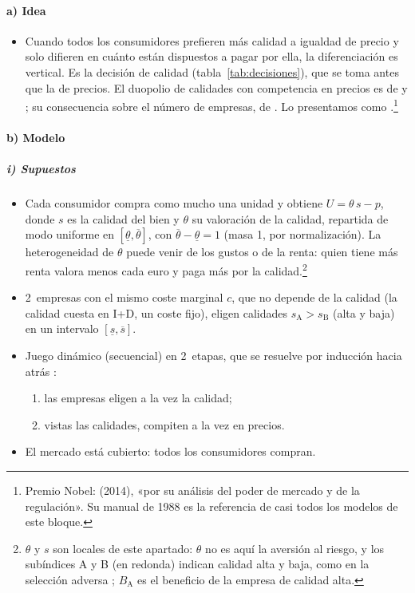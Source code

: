 \documentclass[11pt]{article}
\begin{document}
\paragraph{a) Idea}

\begin{itemize}
\item Cuando todos los consumidores prefieren más calidad a igualdad de precio y solo difieren en cuánto están dispuestos a pagar por ella, la diferenciación es vertical. Es la decisión de calidad (tabla~\ref{tab:decisiones}), que se toma antes que la de precios. El duopolio de calidades con competencia en precios es de \textcite{GabszewiczThisse1979Price} y \textcite{ShakedSutton1982Relaxing}; su consecuencia sobre el número de empresas, de \textcite{ShakedSutton1983Natural}. Lo presentamos como \textcite[cap.~7]{Tirole1988Theory}.\footnote{Premio Nobel:  (2014), «por su análisis del poder de mercado y de la regulación»\nocite{Nobel2014Tirole}. Su manual de 1988 es la referencia de casi todos los modelos de este bloque.}
\end{itemize}

\paragraph{b) Modelo}

\subparagraph{i) Supuestos}

\begin{itemize}
\item Cada consumidor compra como mucho una unidad y obtiene $U=\theta\,s-p$, donde $s$ es la calidad del bien y $\theta$ su valoración de la calidad, repartida de modo uniforme en $[\underline{\theta},\overline{\theta}]$, con $\overline{\theta}-\underline{\theta}=1$ (masa 1, por normalización). La heterogeneidad de $\theta$ puede venir de los gustos o de la renta: quien tiene más renta valora menos cada euro y paga más por la calidad.\footnote{$\theta$ y $s$ son locales de este apartado: $\theta$ no es aquí la aversión al riesgo, y los subíndices A y B (en redonda) indican calidad alta y baja, como en la selección adversa ; $B_{\mathrm{A}}$ es el beneficio de la empresa de calidad alta.}
\item 2~empresas con el mismo coste marginal $c$, que no depende de la calidad (la calidad cuesta en I+D, un coste fijo), eligen calidades $s_{\mathrm{A}}>s_{\mathrm{B}}$ (alta y baja) en un intervalo $[\underline{s},\overline{s}]$.
\item Juego dinámico (secuencial) en 2~etapas, que se resuelve por inducción hacia atrás :
  \begin{enumerate}
  \item las empresas eligen a la vez la calidad;
  \item vistas las calidades, compiten a la vez en precios.
  \end{enumerate}
\item El mercado está cubierto: todos los consumidores compran.
\end{itemize}
\end{document}
